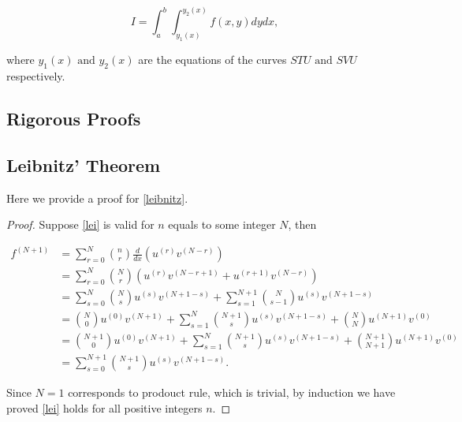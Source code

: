 \documentclass[english,a4paper,12pt]{report}
\begin{document}
\begin{equation}
    I = \int_{a}^{b} \int_{y_1 (x)}^{y_2 (x)} f(x,y) dy dx,
\end{equation}

where \(y_1 (x) \text { and } y_2 (x)\) are the equations of the curves \(STU \text { and } SVU\) respectively.   

\begin{appendices}
\chapter{Rigorous Proofs}
\section{Leibnitz' Theorem} \label{leibnitzapp} 

Here we provide a proof for \cref{leibnitz}.

\begin{proof}
Suppose \cref{lei} is valid for \(n\) equals to some integer \(N\), then

\begin{equation}
    \begin{aligned}
        f^{(N+1)} &= \sum_{r=0}^{N} \binom{n}{r} \frac{d}{dx}(u^{(r)} v^{(N-r)} ) \\
        &= \sum_{r=0}^{N} \binom{N}{r} (u^{(r)} v^{(N-r+1)} + u^{(r+1)}v^{(N-r)}  ) \\
        &= \sum_{s=0}^{N} \binom{N}{s}u^{(s)}v^{(N+1-s)} + \sum_{s=1}^{N+1} \binom{N}{s-1} u^{(s)}v^{(N+1-s)} \\
        &= \binom{N}{0}u^{(0)} v^{(N+1)} + \sum_{s=1}^{N} \binom{N+1}{s}u^{(s)}v^{(N+1-s)} + \binom{N}{N}u^{(N+1)} v^{(0)} \\
        &= \binom{N+1}{0}u^{(0)} v^{(N+1)} + \sum_{s=1}^{N} \binom{N+1}{s}u^{(s)}v^{(N+1-s)} + \binom{N+1}{N+1}u^{(N+1)} v^{(0)} \\
        &= \sum_{s=0}^{N+1} \binom{N+1}{s} u^{(s)}v^{(N+1-s)}.  
    \end{aligned}
\end{equation}

Since \(N=1\) corresponds to prodouct rule, which is trivial, by induction we have proved \cref{lei} holds for all positive integers \(n\). 

\end{proof}


\end{appendices}
\end{document}
